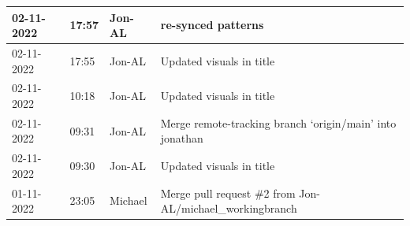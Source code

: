 \documentclass[11pt]{article}
\begin{document}
\begin{center}
\begin{longtable}{|p{2cm}|l|p{2cm}|p{10.5cm}|}
            02-11-2022                                 & 17:57                              & Jon-AL                                  & re-synced patterns                                                                                                                                                                                                                                                                                           \\ \hline
            02-11-2022                                 & 17:55                              & Jon-AL                                  & Updated visuals in title                                                                                                                                                                                                                                                                                     \\ \hline
            02-11-2022                                 & 10:18                              & Jon-AL                                  & Updated visuals in title                                                                                                                                                                                                                                                                                     \\ \hline
            02-11-2022                                 & 09:31                              & Jon-AL                                  & Merge remote-tracking branch `origin/main' into jonathan                                                                                                                                                                                                                                                     \\ \hline
            02-11-2022                                 & 09:30                              & Jon-AL                                  & Updated visuals in title                                                                                                                                                                                                                                                                                     \\ \hline
            01-11-2022                                 & 23:05                              & Michael                                 & Merge pull request \#2 from Jon-AL/michael\_workingbranch                                                                                                                                                                                                                                                    \\ \hline

\end{longtable}
\end{center}
\end{document}
